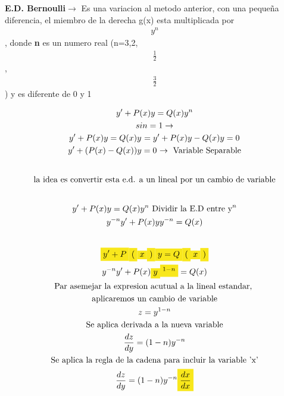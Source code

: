 \documentclass{article}
\begin{document}
\textbf{E.D. Bernoulli$\rightarrow$  }Es una variacion al metodo anterior, con una pequeña diferencia, el miembro de la derecha  g(x)  esta multiplicada por 
\begin{gather*}
y^{n}
\end{gather*}
, donde \textbf{n} es un numero real (n=3,2, 
\begin{gather*}
\frac{1}{2}
\end{gather*}
, 
\begin{gather*}
\frac{3}{2}
\end{gather*}
) y es diferente de 0 y 1


\begin{gather*}
y'+P(x)y=Q(x)y^{n} \\
si n = 1  \rightarrow  \\
y'+P(x)y=Q(x)y^{} =y' +P(x)y-Q(x)y=0^{} \\
y' +(P(x)-Q(x))y=0^{}  \rightarrow \text{ Variable Separable} \\
\vspace{0.5em} \\
\text{la idea es convertir esta e.d. a un lineal por un cambio de variable} \\
\vspace{0.5em} \\
y'+P(x)y=Q(x)y^{n}\text{ Dividir la E.D entre y}^{n}  \\
y^{-n}y'+P(x)yy^{-n}=Q(x) \\
\vspace{0.5em} \\
\text{\colorbox[RGB]{248,231,28}{$y'+P$}}\text{\colorbox[RGB]{248,231,28}{$($}}\text{\colorbox[RGB]{248,231,28}{$x$}}\text{\colorbox[RGB]{248,231,28}{$)$}}\text{\colorbox[RGB]{248,231,28}{$y=Q$}}\text{\colorbox[RGB]{248,231,28}{$($}}\text{\colorbox[RGB]{248,231,28}{$x$}}\text{\colorbox[RGB]{248,231,28}{$)$}} \\
y^{-n}y'+P(x)\text{\colorbox[RGB]{248,231,28}{$y$}}\text{\colorbox[RGB]{248,231,28}{$^{1-n}$}}=Q(x) \\
\text{Par asemejar la expresion acutual a la lineal estandar, } \\
\text{aplicaremos un cambio de variable} \\
z=y^{1-n} \\
\text{Se aplica derivada a la nueva variable} \\
\frac{dz}{dy} = (1-n)y^{-n} \\
\text{Se aplica la regla de la cadena para incluir la variable 'x'} \\
\frac{dz}{dy} = (1-n)y^{-n}\text{\colorbox[RGB]{248,231,28}{$\frac{dx}{dx}$}}           \\

\end{gather*}
\end{document}
